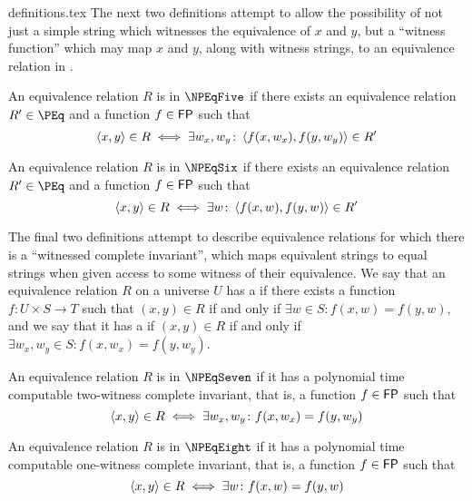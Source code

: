 \begin{filecontents}{definitions.tex}
The next two definitions attempt to allow the possibility of not just a simple string which witnesses the equivalence of $x$ and $y$, but a ``witness function'' which may map $x$ and $y$, along with witness strings, to an equivalence relation in \PEq.
\begin{definition}\label{def:npeq5}
  An equivalence relation $R$ is in $\NPEqFive$ if there exists an equivalence relation $R'\in \PEq$ and a function $f\in\FP$ such that
  \begin{displaymath}
    \pair{x}{y}\in R\iff \exists w_x,w_y\colon \pair{f(x, w_x)}{f(y, w_y)}\in R'
  \end{displaymath}
\end{definition}
\begin{definition}\label{def:npeq6}
  An equivalence relation $R$ is in $\NPEqSix$ if there exists an equivalence relation $R'\in \PEq$ and a function $f\in\FP$ such that
  \begin{displaymath}
    \pair{x}{y}\in R\iff \exists w\colon \pair{f(x, w)}{f(y, w)}\in R'
  \end{displaymath}
\end{definition}

The final two definitions attempt to describe equivalence relations for which there is a ``witnessed complete invariant'', which maps equivalent strings to equal strings when given access to some witness of their equivalence.
We say that an equivalence relation $R$ on a universe $U$ has a  if there exists a function $f\colon U\times S\to T$ such that $(x,y)\in R$ if and only if $\exists w\in S\colon f(x, w)=f(y, w)$, and we say that it has a  if $(x, y)\in R$ if and only if $\exists w_x, w_y\in S\colon f(x, w_x)=f(y, w_y)$.
\begin{definition}\label{def:npeq7}
  An equivalence relation $R$ is in $\NPEqSeven$ if it has a polynomial time computable two-witness complete invariant, that is, a function $f\in\FP$ such that
  \begin{displaymath}
    \pair{x}{y}\in R\iff \exists w_x, w_y\colon f(x, w_x) = f(y, w_y)
  \end{displaymath}
\end{definition}
\begin{definition}\label{def:npeq8}
  An equivalence relation $R$ is in $\NPEqEight$ if it has a polynomial time computable one-witness complete invariant, that is, a function $f\in\FP$ such that
  \begin{displaymath}
    \pair{x}{y}\in R\iff \exists w\colon f(x, w) = f(y, w)
  \end{displaymath}
\end{definition}


\end{filecontents}
